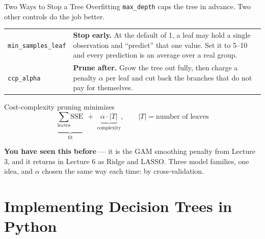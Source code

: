 \documentclass[aspectratio=169, 11pt]{beamer}
\begin{document}
\begin{frame}{Two Ways to Stop a Tree Overfitting}
  \texttt{max\_depth} caps the tree in advance. Two other controls do the job better.
  \begin{center}
    {\small
    \begin{tabular}{p{3.2cm}p{9.2cm}}
      \toprule
      \texttt{min\_samples\_leaf} & \textbf{Stop early.} At the default of 1, a leaf may hold a
      single observation and ``predict'' that one value. Set it to 5--10 and every prediction is
      an average over a real group. \\[3pt]
      \texttt{ccp\_alpha} & \textbf{Prune after.} Grow the tree out fully, then charge a penalty
      $\alpha$ per leaf and cut back the branches that do not pay for themselves. \\
      \bottomrule
    \end{tabular}
    }
  \end{center}
  \vspace{-0.1cm}
  Cost-complexity pruning minimizes
  \vspace{-0.2cm}
  \[
    \underbrace{\textstyle\sum_{\text{leaves}} \text{SSE}}_{\text{fit}}
    \;+\; \underbrace{\alpha \cdot |T|}_{\text{complexity}},
    \qquad |T| = \text{number of leaves}
  \]
  \vspace{-0.25cm}

  \textbf{You have seen this before} --- it is the GAM smoothing penalty from Lecture 3, and it
  returns in Lecture 6 as Ridge and LASSO. Three model families, one idea, and $\alpha$ chosen
  the same way each time: by cross-validation.
\end{frame}

\section{Implementing Decision Trees in Python}

\end{document}
